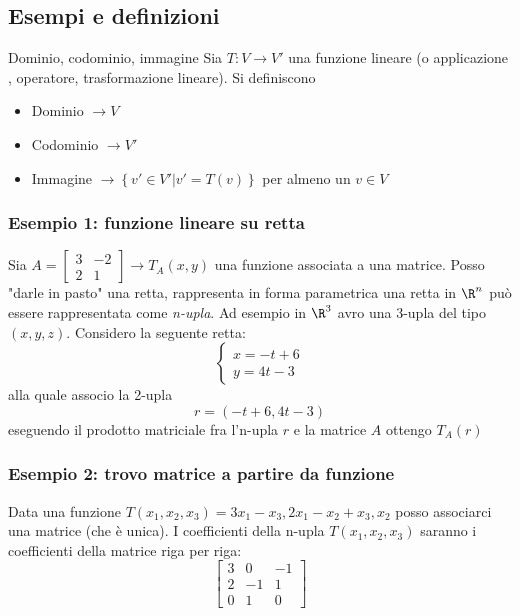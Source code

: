 \subsection{Esempi e definizioni}
\begin{definizione}{Dominio, codominio, immagine}
	Sia $ T : V \to V'$ una funzione lineare (o applicazione , operatore, trasformazione lineare). Si definiscono
	\begin{itemize}
		\item Dominio $ \rightarrow V $
		\item Codominio $ \to V' $
		\item Immagine $ \rightarrow \left\{ v' \in  V' | v' = T\left( v \right)  \right\}  $ per almeno un $ v \in  V $
	\end{itemize}
\end{definizione}
\subsubsection*{Esempio 1: funzione lineare su retta}
Sia $ A = \begin{bmatrix}
		3 & -2 \\
		2 & 1
	\end{bmatrix} \rightarrow T_A \left( x,y \right) $ una funzione associata a una matrice.
Posso "darle in pasto" una retta, rappresenta in forma parametrica una retta in $ \R^{n} $ può essere rappresentata come \textit{n-upla}. Ad esempio in $ \R^{3} $ avro una 3-upla del tipo $ \left( x,y,z \right)  $. Considero la seguente retta:
\[
	\begin{cases}
		x= -t+6 \\
		y=4t-3
	\end{cases}
\]
alla quale associo la 2-upla
\[
	r = \left( -t + 6 , 4t -3\right)
\]
eseguendo il prodotto matriciale fra l'n-upla $ r $ e la matrice $ A $ ottengo $  T_A\left( r \right) $
\subsubsection*{Esempio 2: trovo matrice a partire da funzione}
Data una funzione $ T\left( x_1,x_2,x_3 \right)  = 3x_1 - x_3, 2x_1 - x_2 + x_3, x_2$ posso associarci una matrice (che è unica). I coefficienti della n-upla $ T\left( x_1,x_2,x_3 \right)  $ saranno i coefficienti della matrice riga per riga:
\[
	\begin{bmatrix}
		3 & 0  & -1 \\
		2 & -1 & 1  \\
		0 & 1  & 0
	\end{bmatrix}
\]
